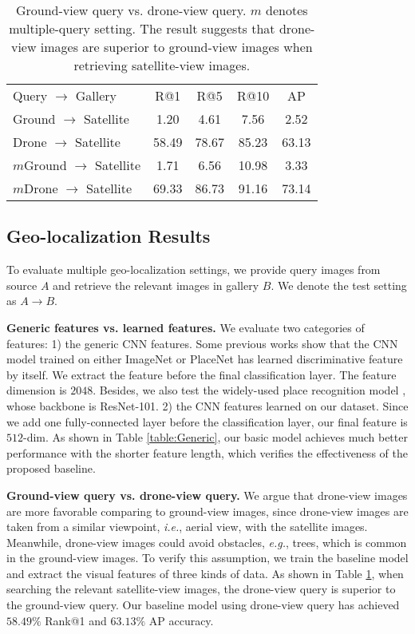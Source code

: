 \documentclass[sigconf]{acmart}
\def\eg{\emph{e.g.}}
\def\ie{\emph{i.e.}}
\begin{document}
\setlength{\tabcolsep}{7pt}
\begin{table}
\small
\begin{center}
\begin{tabular}{l|cccc}
\hline
Query $\rightarrow$ Gallery & R@1 & R@5 & R@10 & AP\\
\shline
Ground $\rightarrow$ Satellite & 1.20 & 4.61 & 7.56 & 2.52 \\
Drone $\rightarrow$ Satellite & 58.49 & 78.67 & 85.23 & 63.13\\
\hline
$m$Ground $\rightarrow$ Satellite & 1.71 & 6.56 & 10.98 & 3.33 \\
$m$Drone $\rightarrow$ Satellite & 69.33 & 86.73 & 91.16 & 73.14 \\
\hline
\end{tabular}
\end{center}
\caption{Ground-view query vs. drone-view query. $m$ denotes multiple-query setting. The result suggests that drone-view images are superior to ground-view images when retrieving satellite-view images.}
\label{table:Street_vs_drone}
\end{table}

\subsection{Geo-localization Results} \label{sec:localization}
To evaluate multiple geo-localization settings, we provide query images from source $A$ and retrieve the relevant images in gallery $B$. We denote the test setting as $A \rightarrow B$.

\noindent\textbf{Generic features vs. learned features.} We evaluate two categories of features: 1) the generic CNN features. Some previous works \cite{workman2015wide} show that the CNN model trained on either ImageNet \cite{deng2009imagenet} or PlaceNet \cite{zhou2017places} has learned discriminative feature by itself. We extract the feature before the final classification layer. The feature dimension is $2048$. Besides, we also test the widely-used place recognition model \cite{radenovic2018fine}, whose backbone is ResNet-101. 
2) the CNN features learned on our dataset. Since we add one fully-connected layer before the classification layer, our final feature is $512$-dim. As shown in Table \ref{table:Generic}, our basic model achieves much better performance with the shorter feature length, which verifies the effectiveness of the proposed baseline. 

\noindent\textbf{Ground-view query vs. drone-view query.} We argue that drone-view images are more favorable comparing to ground-view images, since drone-view images are taken from a similar viewpoint, \ie, aerial view, with the satellite images. Meanwhile, drone-view images could avoid obstacles, \eg, trees, which is common in the ground-view images. To verify this assumption, we train the baseline model and extract the visual features of three kinds of data. As shown in Table \ref{table:Street_vs_drone}, when searching the relevant satellite-view images, the drone-view query is superior to the ground-view query. Our baseline model using drone-view query has achieved $58.49\%$ Rank@1 and $63.13\%$ AP accuracy. 
\end{document}
